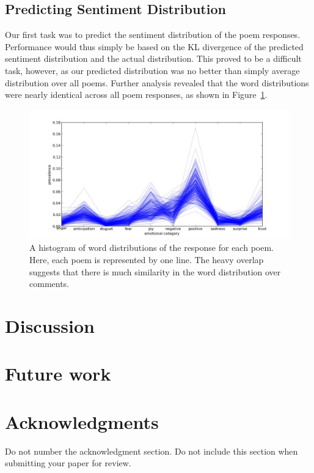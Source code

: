 \documentclass[11pt]{article}
\begin{document}
\subsection{Predicting Sentiment Distribution}
Our first task was to predict the sentiment distribution of the poem responses. Performance would thus simply be based on the KL divergence of the predicted sentiment distribution and the actual distribution. This proved to be a difficult task, however, as our predicted distribution was no better than simply average distribution over all poems. Further analysis revealed that the word distributions were nearly identical across all poem responses, as shown in Figure~\ref{histogram}.

\begin{figure}[ht]
\begin{center}
\includegraphics[scale=0.4]{../experiments/exp10.jpg}
\end{center}
\caption{A histogram of word distributions of the response for each poem. Here, each poem is represented by one line. The heavy overlap suggests that there is much similarity in the word distribution over comments.}
\label{histogram}
\end{figure}

\section{Discussion}



\section{Future work}





\section*{Acknowledgments}

Do not number the acknowledgment section. Do not include this section when submitting your paper for review.



\end{document}
